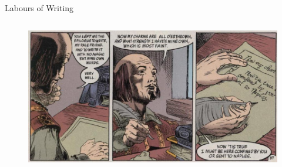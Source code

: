 \documentclass{beamer}
\begin{document}
\begin{frame}{Labours of Writing}
\begin{columns}[c]
      \begin{figure}[htp]
        \begin{center}
          \centering
          \includegraphics[scale=0.3]{../Presentation/epilogue.jpg}
        \end{center}
      \end{figure}
      
      \end{columns}
    \end{frame}
\end{document}
